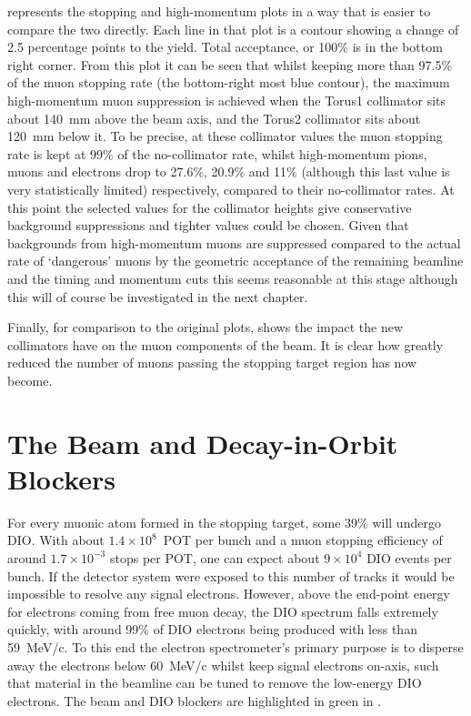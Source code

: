 \FigOptimMuBeamCollimMuonPathsWColl
{} represents the stopping and high-momentum plots in a way that is easier to compare the two directly.
Each line in that plot is a contour showing a change of 2.5 percentage points to the yield.  Total acceptance, or 100\% is in the bottom right corner.
From this plot it can be seen that whilst keeping more than 97.5\% of the muon stopping rate (the bottom-right most blue contour), the maximum high-momentum muon suppression is achieved when the Torus1 collimator sits about 140~mm above the beam axis, and the Torus2 collimator sits about 120~mm below it.
To be precise, at these collimator values  the muon stopping rate is kept at 99\% of the no-collimator rate, whilst high-momentum pions, muons and electrons drop to 27.6\%, 20.9\% and 11\% (although this last value is very statistically limited) respectively, compared to their no-collimator rates.
At this point the selected values for the collimator heights give conservative background suppressions and tighter values could be chosen.
Given that backgrounds from high-momentum muons are suppressed compared to the actual rate of `dangerous' muons by the geometric acceptance of the remaining beamline and the timing and momentum cuts this seems reasonable at this stage although this will of course be investigated in the next chapter.

Finally, for comparison to the original plots,  shows the impact the new collimators have on the muon components of the beam.
It is clear how greatly reduced the number of muons passing the stopping target region has now become.
\clearpage

\section{The Beam and Decay-in-Orbit Blockers}
\FigOptimDIOBeamBlockGeometry
\FigOptimDIOBeamBlockESTDispersion
For every muonic atom formed in the stopping target, some 39\% will undergo \acf{DIO}.
With about $1.4\times10^{8}$~\ac{POT} per bunch and a muon stopping efficiency of around $1.7\times10^{-3}$ stops per \ac{POT}, one can expect about $9\times10^{4}$ DIO events per bunch.
If the detector system were exposed to this number of tracks it would be impossible to resolve any signal electrons.
However, above the end-point energy for electrons coming from free muon decay, the DIO spectrum falls extremely quickly, with around 99\% of DIO electrons being produced with less than 59~MeV/c.
To this end the electron spectrometer's primary purpose is to disperse away the electrons below 60~MeV/c whilst keep signal electrons on-axis, such that material in the beamline can be tuned to remove the low-energy DIO electrons.
The beam and DIO blockers are highlighted in green in .

